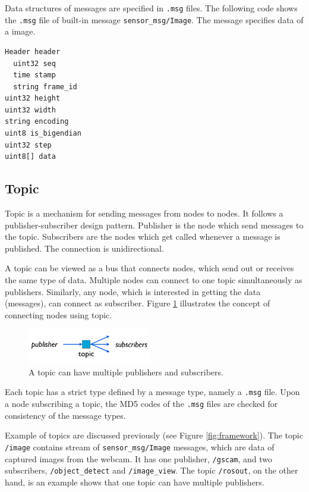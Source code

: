 \documentclass[a4paper, 10pt, conference]{ieeeconf}       %
\begin{document}
Data structures of messages are specified in \texttt{.msg} files. The following code shows the \texttt{.msg} file of built-in message \texttt{sensor\_msg/Image}. The message specifies data of a image.

\vspace{8pt}
\begin{Verbatim}[frame=single]
Header header 
  uint32 seq 
  time stamp 
  string frame_id 
uint32 height 
uint32 width 
string encoding 
uint8 is_bigendian 
uint32 step 
uint8[] data
\end{Verbatim}

\subsection{Topic}

Topic is a mechanism for sending messages from nodes to nodes. It follows a publisher-subscriber design pattern. Publisher is the node which send messages to the topic. Subscribers are the nodes which get called whenever a message is published. The connection is unidirectional.

A topic can be viewed as a bus that connects nodes, which send out or receives the same type of data. Multiple nodes can connect to one topic simultaneously as publishers. Similarly, any node, which is interested in getting the data (messages), can connect as subscriber. Figure 
\ref{fig:topic} illustrates the concept of connecting nodes using topic.

\begin{figure}[htpb]
  \centering
  \includegraphics[width=0.48\textwidth]{topic}
  \caption{A topic can have multiple publishers and subscribers.}
  \label{fig:topic}
\end{figure}

Each topic has a strict type defined by a message type, namely a \texttt{.msg} file. Upon a node subscribing a topic, the MD5 codes of the \texttt{.msg} files are checked for consistency of the message types.

Example of topics are discussed previously (see Figure \ref{fig:framework}). The topic \texttt{/image} contains stream of \texttt{sensor\_msg/Image} messages, which are data of captured images from the webcam. It has one publisher, \texttt{/gscam}, and two subscribers, \texttt{/object\_detect} and \texttt{/image\_view}. The topic \texttt{/rosout}, on the other hand, is an example shows that one topic can have multiple publishers.
\end{document}
